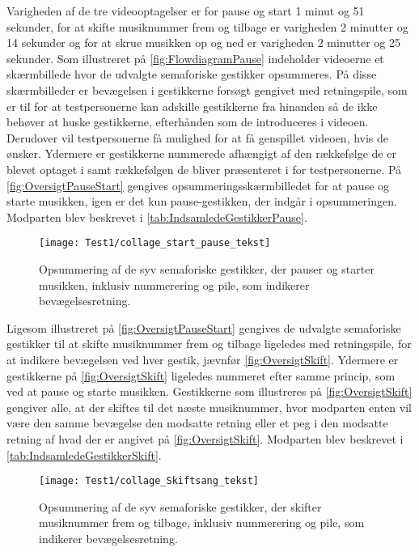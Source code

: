 Varigheden af de tre videooptagelser er for pause og start 1 minut og 51 sekunder, for at skifte musiknummer frem og tilbage er varigheden 2 minutter og 14 sekunder og for at skrue musikken op og ned er varigheden 2 minutter og 25 sekunder.\blankline
%
Som illustreret på \autoref{fig:FlowdiagramPause} indeholder videoerne et skærmbillede hvor de udvalgte semaforiske gestikker opsummeres. På disse skærmbilleder er bevægelsen i gestikkerne forsøgt gengivet med retningspile, som er til for at testpersonerne kan adskille gestikkerne fra hinanden så de ikke behøver at huske gestikkerne, efterhånden som de introduceres i videoen. Derudover vil testpersonerne få mulighed for at få genspillet videoen, hvis de ønsker. Ydermere er gestikkerne nummerede afhængigt af den rækkefølge de er blevet optaget i samt rækkefølgen de bliver præsenteret i for testpersonerne. På \autoref{fig:OversigtPauseStart} gengives opsummeringsskærmbilledet for at pause og starte musikken, igen er det kun pause-gestikken, der indgår i opsummeringen. Modparten blev beskrevet i \autoref{tab:IndsamledeGestikkerPause}.  
% 
\begin{figure}[H]
	\centering
	\texttt{[image: Test1/collage\_start\_pause\_tekst]}
	\caption{Opsummering af de syv semaforiske gestikker, der pauser og starter musikken, inklusiv nummerering og pile, som indikerer bevægelsesretning.}
	\label{fig:OversigtPauseStart}
\end{figure}
\noindent
%
Ligesom illustreret på \autoref{fig:OversigtPauseStart} gengives de udvalgte semaforiske gestikker til at skifte musiknummer frem og tilbage ligeledes med retningspile, for at indikere bevægelsen ved hver gestik, jævnfør \autoref{fig:OversigtSkift}. Ydermere er gestikkerne på \autoref{fig:OversigtSkift} ligeledes nummeret efter samme princip, som ved at pause og starte musikken. Gestikkerne som illustreres på \autoref{fig:OversigtSkift} gengiver alle, at der skiftes til det næste musiknummer, hvor modparten enten vil være den samme bevægelse den modsatte retning eller et peg i den modsatte retning af hvad der er angivet på \autoref{fig:OversigtSkift}. Modparten blev beskrevet i \autoref{tab:IndsamledeGestikkerSkift}.
%
\begin{figure}[H]
	\centering
	\texttt{[image: Test1/collage\_Skiftsang\_tekst]}
	\caption{Opsummering af de syv semaforiske gestikker, der skifter musiknummer frem og tilbage, inklusiv nummerering og pile, som indikerer bevægelsesretning.}
	\label{fig:OversigtSkift}
\end{figure}
